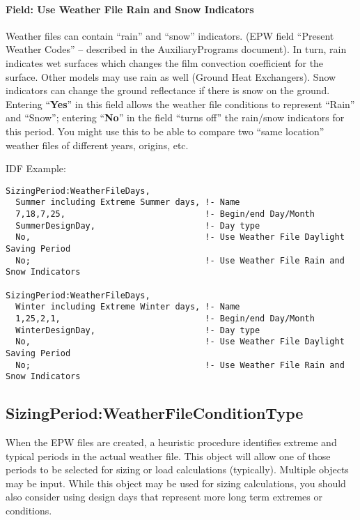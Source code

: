 \paragraph{Field: Use Weather File Rain and Snow Indicators}\label{field-use-weather-file-rain-and-snow-indicators}

Weather files can contain ``rain'' and ``snow'' indicators. (EPW field ``Present Weather Codes'' -- described in the AuxiliaryPrograms document). In turn, rain indicates wet surfaces which changes the film convection coefficient for the surface. Other models may use rain as well (Ground Heat Exchangers). Snow indicators can change the ground reflectance if there is snow on the ground. Entering ``\textbf{Yes}'' in this field allows the weather file conditions to represent ``Rain'' and ``Snow''; entering ``\textbf{No}'' in the field ``turns off'' the rain/snow indicators for this period. You might use this to be able to compare two ``same location'' weather files of different years, origins, etc.

IDF Example:

\begin{lstlisting}
SizingPeriod:WeatherFileDays,
  Summer including Extreme Summer days, !- Name
  7,18,7,25,                            !- Begin/end Day/Month
  SummerDesignDay,                      !- Day type
  No,                                   !- Use Weather File Daylight Saving Period
  No;                                   !- Use Weather File Rain and Snow Indicators

SizingPeriod:WeatherFileDays,
  Winter including Extreme Winter days, !- Name
  1,25,2,1,                             !- Begin/end Day/Month
  WinterDesignDay,                      !- Day type
  No,                                   !- Use Weather File Daylight Saving Period
  No;                                   !- Use Weather File Rain and Snow Indicators
\end{lstlisting}

\subsection{Sizing\-Period:\-Weather\-File\-Con\-dition\-Type}\label{sizingperiodweatherfileconditiontype}

When the EPW files are created, a heuristic procedure identifies extreme and typical periods in the actual weather file. This object will allow one of those periods to be selected for sizing or load calculations (typically). Multiple objects may be input. While this object may be used for sizing calculations, you should also consider using design days that represent more long term extremes or conditions.

